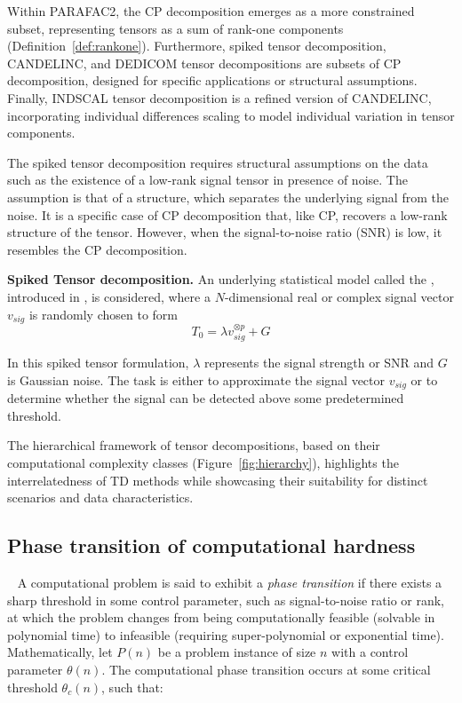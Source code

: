  Within PARAFAC2, the CP decomposition emerges as a more constrained subset, representing tensors as a sum of rank-one components (Definition~\ref{def:rankone}). Furthermore, spiked tensor decomposition, CANDELINC, and DEDICOM tensor decompositions are subsets of CP decomposition, designed for specific applications or structural assumptions. Finally, INDSCAL tensor decomposition is a refined version of CANDELINC, incorporating individual differences scaling to model individual variation in tensor components. 
 
 The spiked tensor decomposition requires structural assumptions on the data such as the existence of a low-rank signal tensor in presence of noise. The assumption is that of a  structure, which separates the underlying signal from the noise. It is a specific case of CP decomposition that, like CP, recovers a low-rank structure of the tensor. However, when the signal-to-noise ratio (SNR) is low, it resembles the CP decomposition. 
 \begin{definition}\label{def:st}
     \textbf{Spiked Tensor decomposition.} An underlying statistical model called the , introduced in \cite{richard2014statistical}, is considered, where a $N$-dimensional real or complex signal vector $v_{sig}$ is randomly chosen to form 
     \begin{equation}\label{eq:st}
          T_0 = \lambda v_{sig}^{\otimes p} +G
     \end{equation} 
       
    In this spiked tensor formulation, $\lambda$ represents the signal strength or SNR and $G$ is Gaussian noise. The task is either to approximate the signal vector $v_{sig}$ or to determine whether the signal can be detected above some predetermined threshold.
 \end{definition}


The hierarchical framework of tensor decompositions, based on their computational complexity classes (Figure~\ref{fig:hierarchy}), highlights the interrelatedness of TD methods while showcasing their suitability for distinct scenarios and data characteristics.

\subsection{Phase transition of computational hardness}~\label{sec:hardness}
A computational problem is said to exhibit a \textit{phase transition} if there exists a sharp threshold in some control parameter, such as signal-to-noise ratio or rank, at which the problem changes from being computationally feasible (solvable in polynomial time) to infeasible (requiring super-polynomial or exponential time). Mathematically, let $P(n)$ be a problem instance of size $n$ with a control parameter $\theta(n)$. The computational phase transition occurs at some critical threshold $\theta_c(n)$, such that:

